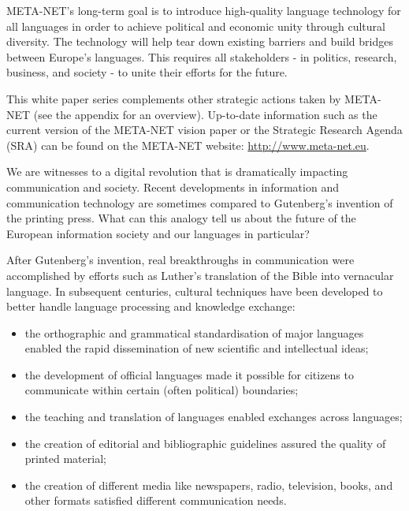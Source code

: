 {\begin{multicols}{2}
META-NET’s long-term goal is to introduce high-quality language technology for all languages in order to achieve political and economic unity through cultural diversity. The technology will help tear down existing barriers and build bridges between Europe’s languages. This requires all stakeholders - in politics, research, business, and society - to unite their efforts for the future.

This white paper series complements other strategic actions taken by META-NET (see the appendix for an overview). Up-to-date information such as the current version of the META-NET vision paper \cite{Meta1} or the Strategic Research Agenda (SRA) can be found on the META-NET website: \url{http://www.meta-net.eu}.
\end{multicols}

\clearpage



\begin{multicols}{2}

We are witnesses to a digital revolution that is dramatically impacting communication and society. Recent developments in information and communication technology are sometimes compared to Gutenberg’s invention of the printing press. What can this analogy tell us about the future of the European information society and our languages in particular?


After Gutenberg’s invention, real breakthroughs in communication were accomplished by efforts such as Luther’s translation of the Bible into vernacular language. In subsequent centuries, cultural techniques have been developed to better handle language processing and knowledge exchange:

\begin{itemize}
\item the orthographic and grammatical standardisation of major languages enabled the rapid dissemination of new scientific and intellectual ideas;
\item the development of official languages made it possible for citizens to communicate within certain (often political) boundaries;
\item the teaching and translation of languages enabled exchanges across languages;
\item the creation of editorial and bibliographic guidelines assured the quality of printed material;
\item the creation of different media like newspapers, radio, television, books, and other formats satisfied different communication needs. 
\end{itemize}


\end{multicols}}
